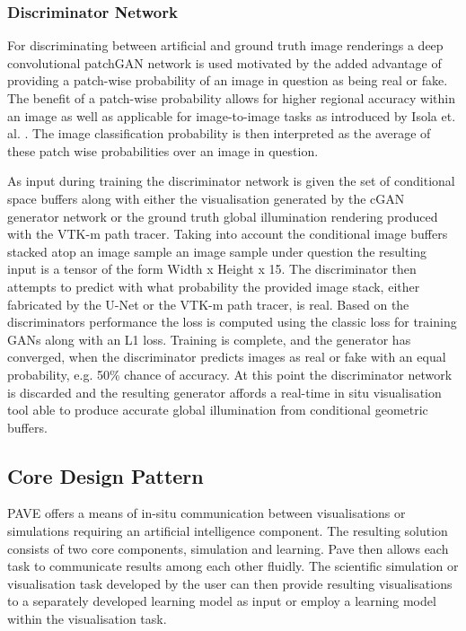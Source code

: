 \documentclass[sigconf,authordraft]{acmart}%
\begin{document}
\subsubsection{Discriminator Network}

For discriminating between artificial and ground truth image renderings a deep convolutional patchGAN network is used motivated by the added advantage of providing a patch-wise probability of an image in question as being real or fake. The benefit of a patch-wise probability allows for higher regional accuracy within an image as well as applicable for image-to-image tasks as introduced by Isola et. al. \cite{isolaPatch}. The image classification probability is then interpreted as the average of these patch wise probabilities over an image in question. 

As input during training the discriminator network is given the set of conditional space buffers along with either the visualisation generated by the cGAN generator network or the ground truth global illumination rendering produced with the VTK-m path tracer. Taking into account the conditional image buffers stacked atop an image sample an image sample under question the resulting input is a tensor of the form Width x Height x 15. The discriminator then attempts to predict with what probability the provided image stack, either fabricated by the U-Net or the VTK-m path tracer, is real. Based on the discriminators performance the loss is computed using the classic loss for training GANs along with an L1 loss. Training is complete, and the generator has converged, when the discriminator predicts images as real or fake with an equal probability, e.g. 50\% chance of accuracy. At this point the discriminator network is discarded and the resulting generator affords a real-time in situ visualisation tool able to produce accurate global illumination from conditional geometric buffers.


\subsection{Core Design Pattern}
 
PAVE offers a means of in-situ communication between visualisations or simulations requiring an artificial intelligence component. The resulting solution consists of two core components, simulation and learning. Pave then allows each task to communicate results among each other fluidly. The scientific simulation or visualisation task developed by the user can then provide resulting visualisations to a separately developed learning model as input or employ a learning model within the visualisation task.  
\end{document}
